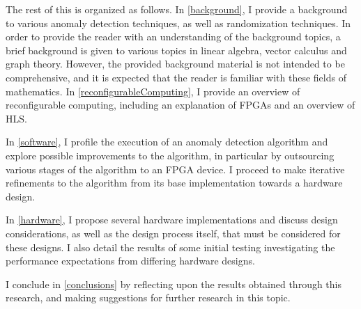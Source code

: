 The rest of this \thesis{} is organized as follows. In \autoref{background}, I
provide a background to various anomaly detection techniques, as well as
randomization techniques. In order to provide the reader with an understanding
of the background topics, a brief background is given to various topics in
linear algebra, vector calculus and graph theory. However, the provided
background material is not intended to be comprehensive, and it is expected that
the reader is familiar with these fields of mathematics. In
\autoref{reconfigurableComputing}, I provide an overview of reconfigurable
computing, including an explanation of \glspl{FPGA} and an overview of
\gls{HLS}.

In \autoref{software}, I profile the execution of an anomaly detection algorithm
and explore possible improvements to the algorithm, in particular by outsourcing
various stages of the algorithm to an FPGA device. I proceed to make iterative
refinements to the algorithm from its base implementation towards a hardware
design.

In \autoref{hardware}, I propose several hardware implementations and discuss
design considerations, as well as the design process itself, that must be
considered for these designs. I also detail the results of some initial testing
investigating the performance expectations from differing hardware designs.

I conclude in \autoref{conclusions} by reflecting upon the results obtained
through this research, and making suggestions for further research in this
topic.